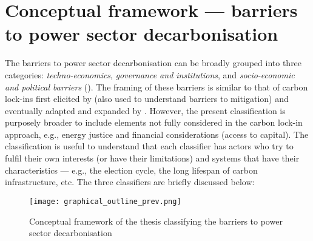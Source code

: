 \documentclass[../thesis.tex]{subfiles}
\begin{document}
\section{Conceptual framework --- barriers to power sector decarbonisation}\label{sec:framework}
The barriers to power sector decarbonisation can be broadly grouped into three categories: \textit{techno-economics}, \textit{governance and institutions}, and \textit{socio-economic and political barriers} (). The framing of these barriers is similar to that of carbon lock-ins first elicited by \citet{unruh2000} (also used to understand barriers to mitigation) and eventually adapted and expanded by \citet{seto2016}. However, the present classification is purposely broader to include elements not fully considered in the carbon lock-in approach, e.g., energy justice and financial considerations (access to capital). The classification is useful to understand that each classifier has actors who try to fulfil their own interests (or have their limitations) and systems that have their characteristics --- e.g., the election cycle, the long lifespan of carbon infrastructure, etc. The three classifiers are briefly discussed below:

\begin{figure}[hbtp]
\centering
\texttt{[image: graphical\_outline\_prev.png]}
\caption{Conceptual framework of the thesis classifying the barriers to power sector decarbonisation}
\label{fig:graphical_outline_prev}
\end{figure}
\end{document}

